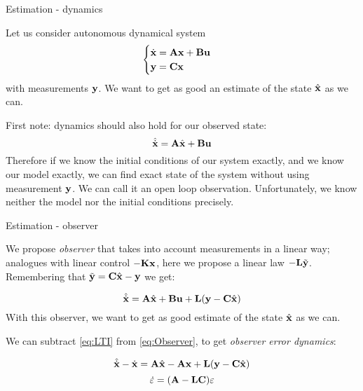 \documentclass{beamer}
\begin{document}
\begin{frame}{Estimation - dynamics}
\begin{flushleft}

Let us consider autonomous dynamical system
\begin{equation}
\label{eq:LTI}
\begin{cases}
\dot {\mathbf{x}} = \mathbf{A} \mathbf{x} + \mathbf{B} \mathbf{u} \\
\mathbf{y} = \mathbf{C} \mathbf{x}
\end{cases}
\end{equation}
%
with measurements $\mathbf{y}$. We want to get as good an estimate of the state $\hat{\mathbf{x}}$ as we can.

\bigskip

First note: dynamics should also hold for our observed state:
\begin{equation}
\hat{\dot {\mathbf{x}}} = \mathbf{A} \hat{\mathbf{x}} + \mathbf{B} \mathbf{u}
\end{equation}
%
Therefore if we know the initial conditions of our system exactly, and we know our model exactly, we can find exact state of the system without using measurement $\mathbf{y}$. We can call it an open loop observation. Unfortunately, we know neither the model nor the initial conditions precisely.


\end{flushleft}
\end{frame}





\begin{frame}{Estimation - observer}
\begin{flushleft}

We propose \emph{observer} that takes into account measurements in a linear way; analogues with linear control $-\mathbf{K}\mathbf{x}$, here we propose a linear law $-\mathbf{L}\Tilde{\mathbf{y}}$. Remembering that $\Tilde{\mathbf{y}} = \mathbf{C} \hat{\mathbf{x}} - \mathbf{y}$ we get:

\begin{equation}
\label{eq:Observer}
\hat{\dot {\mathbf{x}}} = \mathbf{A} \hat{\mathbf{x}} + \mathbf{B} \mathbf{u} + \mathbf{L}(\mathbf{y} - \mathbf{C} \hat{\mathbf{x}})
\end{equation}
%
With this observer, we want to get as good estimate of the state $\hat{\mathbf{x}}$ as we can.

\bigskip

We can subtract \eqref{eq:LTI} from \eqref{eq:Observer}, to get \emph{observer error dynamics}:

\begin{equation}
\hat{\dot {\mathbf{x}}} - \dot {\mathbf{x}}= 
\mathbf{A} \hat{\mathbf{x}} - \mathbf{A} \mathbf{x} + 
\mathbf{L}(\mathbf y - \mathbf{C} \hat{\mathbf{x}})
\end{equation}
%
\begin{equation}
\dot {\varepsilon}= 
(\mathbf{A} - \mathbf{L} \mathbf{C}) \varepsilon
\end{equation}

\end{flushleft}
\end{frame}
\end{document}

